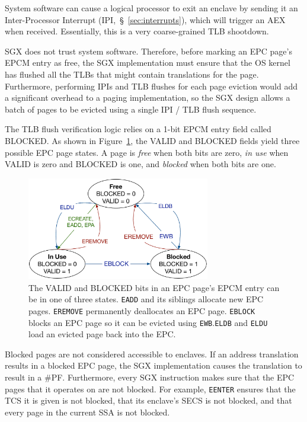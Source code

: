 System software can cause a logical processor to exit an enclave by sending it
an Inter-Processor Interrupt (IPI,~\S~\ref{sec:interrupts}), which will trigger
an AEX when received. Essentially, this is a very coarse-grained TLB shootdown.

SGX does not trust system software. Therefore, before marking an EPC page's
EPCM entry as free, the SGX implementation must ensure that the OS kernel has
flushed all the TLBs that might contain translations for the page. Furthermore,
performing IPIs and TLB flushes for each page eviction would add a significant
overhead to a paging implementation, so the SGX design allows a batch of pages
to be evicted using a single IPI / TLB flush sequence.


The TLB flush verification logic relies on a 1-bit EPCM entry field called
BLOCKED. As shown in Figure~\ref{fig:sgx_page_states}, the VALID and BLOCKED
fields yield three possible EPC page states. A page is \textit{free} when both
bits are zero, \textit{in use} when VALID is zero and BLOCKED is one, and
\textit{blocked} when both bits are one.

\begin{figure}[hbt]
  \centering
  \includegraphics[width=80mm]{figures/sgx_page_states.pdf}
  \caption{
    The VALID and BLOCKED bits in an EPC page's EPCM entry can be in one of
    three states. \texttt{EADD} and its siblings allocate new EPC pages.
    \texttt{EREMOVE} permanently deallocates an EPC page. \texttt{EBLOCK}
    blocks an EPC page so it can be evicted using \texttt{EWB}.\texttt{ELDB}
    and \texttt{ELDU} load an evicted page back into the EPC.
  }
  \label{fig:sgx_page_states}
\end{figure}

Blocked pages are not considered accessible to enclaves. If an address
translation results in a blocked EPC page, the SGX implementation causes the
translation to result in a \#PF. Furthermore, every SGX instruction makes sure
that the EPC pages that it operates on are not blocked. For example,
\texttt{EENTER} ensures that the TCS it is given is not blocked, that its
enclave's SECS is not blocked, and that every page in the current SSA is not
blocked.


